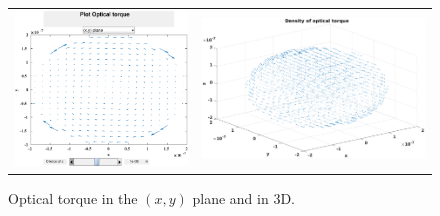 \begin{figure}[H]
\begin{center}
\begin{tabular}{cc}
  \includegraphics*[width=7.0cm,draft=false]{test1torque2d.eps}
&  \includegraphics*[width=9.0cm,draft=false]{test1torque3d.eps}
\end{tabular}

\end{center}
\caption{Optical torque in the $(x,y)$ plane and in 3D.}
\end{figure}

